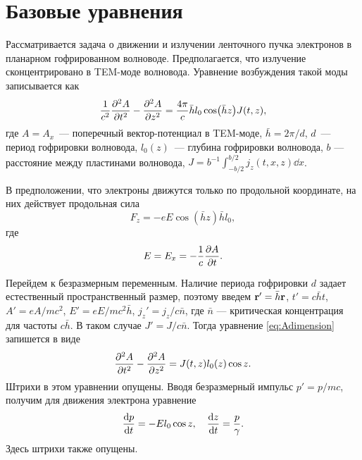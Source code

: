 \documentclass[DIV=11,12pt,a4paper]{scrartcl}
\begin{document}
\tableofcontents

\section{Базовые уравнения}

Рассматривается задача о движении и излучении ленточного пучка электронов в планарном гофрированном волноводе.
Предполагается, что излучение сконцентрировано в TEM-моде волновода.
Уравнение возбуждения такой моды записывается как
\begin{equation}
    \frac{1}{c^2}\pdv[2]{A}{t} - \pdv[2]{A}{z} = \frac{4\pi}{c} \bar{h} l_0 \cos(\bar{h} z) J(t,z),
    \label{eq:Adimension}
\end{equation}
где $A=A_x$~--- поперечный вектор-потенциал в TEM-моде, $\bar{h} = 2\pi/d$, $d$~--- период гофрировки волновода, $l_0(z)$~--- глубина гофрировки волновода, $b$ --- расстояние между пластинами волновода, $J = b^{-1}\int_{-b/2}^{b/2} j_z(t,x,z) \dd{x}$.

В предположении, что электроны движутся только по продольной координате, на них действует продольная сила
\begin{equation}
    F_z = -e E \cos(\bar{h}z) \bar{h} l_0,
\end{equation}
где 
\begin{equation}
    E = E_x = -\frac{1}{c}\pdv{A}{t}.
\end{equation}

Перейдем к безразмерным переменным.
Наличие периода гофрировки $d$ задает естественный пространственный размер, поэтому введем $\vb{r}' = \bar{h} \vb{r}$, $t' = c\bar{h} t$, $A' = eA/mc^2$, $E' = eE/mc^2\bar{h}$, $j_z' = j_z / c \bar{n}$, где $\bar{n}$ --- критическая концентрация для частоты $c\bar{h}$.
В таком случае $J' = J/c \bar{n}$.
Тогда уравнение \eqref{eq:Adimension} запишется в виде
\begin{equation}
    \pdv[2]{A}{t} - \pdv[2]{A}{z} = J(t, z) l_0(z) \cos z.
\end{equation}
Штрихи в этом уравнении опущены.
Вводя безразмерный импульс $p' = p/mc$, получим для движения электрона уравнение
\begin{equation}
    \dv{p}{t} = - E l_0 \cos z, \quad \dv{z}{t} = \frac{p}{\gamma}.
\end{equation}
Здесь штрихи также опущены.
\end{document}
